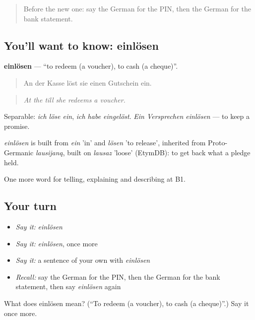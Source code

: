 \begin{quote}
Before the new one: say the German for the PIN, then the German for the bank statement.
\end{quote}

\subsection*{You'll want to know: einlösen}
\textbf{einlösen} — \textquotedblleft{}to redeem (a voucher), to cash (a cheque)\textquotedblright{}.

\begin{quote}
An der Kasse löst sie einen Gutschein ein.
\end{quote}

\begin{quote}
\emph{At the till she redeems a voucher.}
\end{quote}

Separable: \emph{ich löse ein}, \emph{ich habe eingelöst}. \emph{Ein Versprechen einlösen} — to keep a promise.

\begin{cousinweb}
\emph{einlösen} is built from \emph{ein} 'in' and \emph{lösen} 'to release', inherited from Proto-Germanic \emph{lausijaną}, built on \emph{lausaz} 'loose' (EtymDB): to get back what a pledge held.
\end{cousinweb}

\begin{grammarlens}[title={What you've built}]
One more word for telling, explaining and describing at B1.
\end{grammarlens}

\subsection*{Your turn}
\begin{itemize}
\raggedright
  \item \emph{Say it:} \emph{einlösen}
  \item \emph{Say it:} \emph{einlösen}, once more
  \item \emph{Say it:} a sentence of your own with \emph{einlösen}
  \item \emph{Recall:} say the German for the PIN, then the German for the bank statement, then say \emph{einlösen} again
\end{itemize}

\begin{tcolorbox}[breakable,colback=teal!4,colframe=teal!35!black,title={Before you move on}]
What does einlösen mean? (\textquotedblleft{}To redeem (a voucher), to cash (a cheque)\textquotedblright{}.) Say it once more.
\end{tcolorbox}
